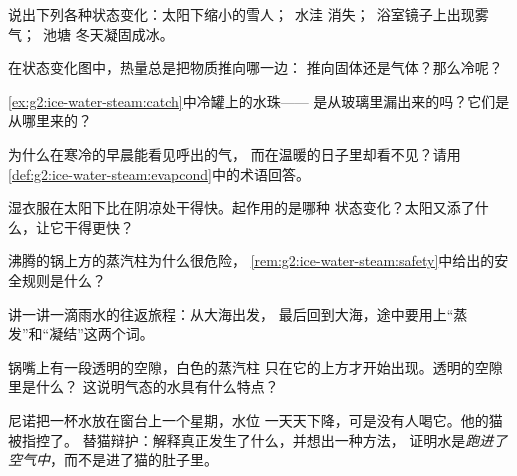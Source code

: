 \begin{exercise}[$\star$]\label{exo:g2:ice-water-steam:2}
说出下列各种状态变化：太阳下缩小的雪人；\ 水洼
消失；\ 浴室镜子上出现雾气；\ 池塘
冬天凝固成冰。
\end{exercise}

\begin{exercise}[$\star$]\label{exo:g2:ice-water-steam:3}
在状态变化图中，热量总是把物质推向哪一边：
推向固体还是气体？那么冷呢？
\end{exercise}

\begin{exercise}[$\star$]\label{exo:g2:ice-water-steam:4}
\cref{ex:g2:ice-water-steam:catch}中冷罐上的水珠——
是从玻璃里漏出来的吗？它们是从哪里来的？
\end{exercise}

\begin{exercise}[$\star$]\label{exo:g2:ice-water-steam:5}
为什么在寒冷的早晨能看见呼出的气，
而在温暖的日子里却看不见？请用\cref{def:g2:ice-water-steam:evapcond}中的术语回答。
\end{exercise}

\begin{exercise}[$\star$]\label{exo:g2:ice-water-steam:6}
湿衣服在太阳下比在阴凉处干得快。起作用的是哪种
状态变化？太阳又添了什么，让它干得更快？
\end{exercise}

\begin{exercise}[$\star$]\label{exo:g2:ice-water-steam:7}
沸腾的锅上方的蒸汽柱为什么很危险，
\cref{rem:g2:ice-water-steam:safety}中给出的安全规则是什么？
\end{exercise}

\begin{exercise}[$\star$]\label{exo:g2:ice-water-steam:8}
讲一讲一滴雨水的往返旅程：从大海出发，
最后回到大海，途中要用上“蒸发”和“凝结”这两个词。
\end{exercise}

\begin{exercise}[$\star\star$]\label{exo:g2:ice-water-steam:9}
锅嘴上有一段透明的空隙，白色的蒸汽柱
只在它的上方才开始出现。透明的空隙里是什么？
这说明气态的水具有什么特点？
\end{exercise}

\begin{exercise}[$\star\star$]\label{exo:g2:ice-water-steam:10}
尼诺把一杯水放在窗台上一个星期，水位
一天天下降，可是没有人喝它。他的猫被指控了。
替猫辩护：解释真正发生了什么，并想出一种方法，
证明水是\emph{跑进了空气中}，而不是进了猫的肚子里。
\end{exercise}
